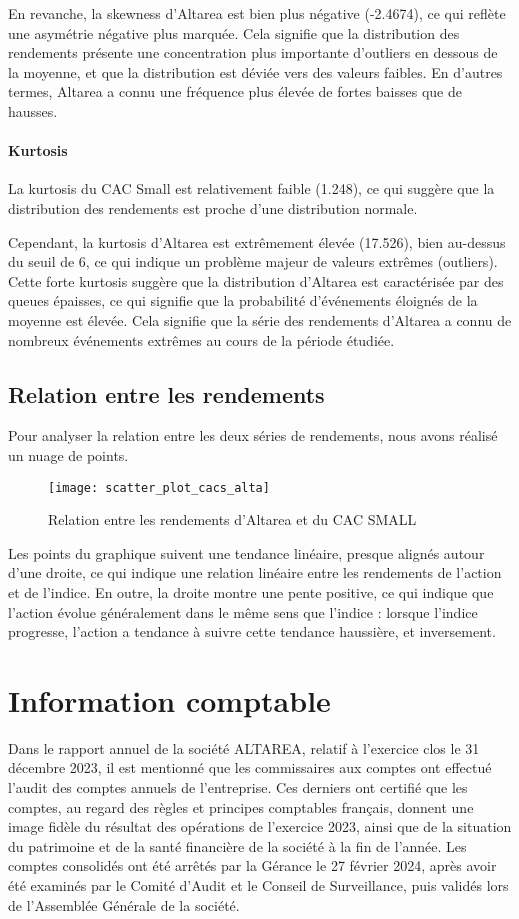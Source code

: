 \documentclass[a4paper, 12pt]{report}
\begin{document}
En revanche, la skewness d'Altarea est bien plus négative (-2.4674), ce qui reflète une asymétrie négative plus marquée. Cela signifie que la distribution des rendements présente une concentration plus importante d'outliers en dessous de la moyenne, et que la distribution est déviée vers des valeurs faibles. En d'autres termes, Altarea a connu une fréquence plus élevée de fortes baisses que de hausses.

\subsubsection{Kurtosis}
\noindent
La kurtosis du CAC Small est relativement faible (1.248), ce qui suggère que la distribution des rendements est proche d'une distribution normale.

Cependant, la kurtosis d'Altarea  est extrêmement élevée (17.526), bien au-dessus du seuil de 6, ce qui indique un problème majeur de valeurs extrêmes (outliers). Cette forte kurtosis suggère que la distribution d'Altarea est caractérisée par des queues épaisses, ce qui signifie que la probabilité d'événements éloignés de la moyenne est élevée. Cela signifie que la série des rendements d'Altarea  a connu de nombreux événements extrêmes au cours de la période étudiée.

\section{Relation entre les rendements}
\noindent
Pour analyser la relation entre les deux séries de rendements, nous avons réalisé un nuage de points. 
\begin{figure}[H]
\begin{center}
	\texttt{[image: scatter\_plot\_cacs\_alta]}
	\caption{Relation entre les rendements d'Altarea et du CAC SMALL}
\end{center}
\end{figure}
Les points du graphique suivent une tendance linéaire, presque alignés autour d'une droite, ce qui indique une relation linéaire entre les rendements de l'action et de l'indice. 
En outre, la droite montre une pente positive, ce qui indique que l'action évolue généralement dans le même sens que l'indice : lorsque l'indice progresse, l'action a tendance à suivre cette tendance haussière, et inversement.

\chapter{Information comptable}
\noindent
Dans le rapport annuel de la société ALTAREA, relatif à l'exercice clos le 31 décembre 2023, il est mentionné que les commissaires aux comptes ont effectué l'audit des comptes annuels de l'entreprise. 
Ces derniers ont certifié que les comptes, au regard des règles et principes comptables français, donnent une image fidèle du résultat des opérations de l'exercice 2023, ainsi que de la situation du patrimoine et de la santé financière de la société à la fin de l'année. 
Les comptes consolidés ont été arrêtés par la Gérance le 27 février 2024, après avoir été examinés par le Comité d’Audit et le Conseil de Surveillance, puis validés lors de l'Assemblée Générale de la société.
\end{document}

